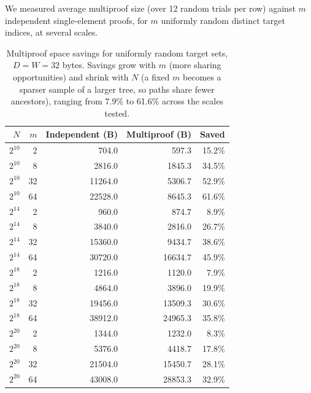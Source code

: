 We measured average multiproof size (over 12 random trials per row) against
$m$ independent single-element proofs, for $m$ uniformly random distinct
target indices, at several scales.

\begin{table}[htbp]
\centering
\begin{tabular}{@{}rrrrr@{}}
\toprule
$N$ & $m$ & Independent (B) & Multiproof (B) & Saved \\
\midrule
$2^{10}$ & 2  &   704.0 &   597.3 & 15.2\% \\
$2^{10}$ & 8  &  2816.0 &  1845.3 & 34.5\% \\
$2^{10}$ & 32 & 11264.0 &  5306.7 & 52.9\% \\
$2^{10}$ & 64 & 22528.0 &  8645.3 & 61.6\% \\
\midrule
$2^{14}$ & 2  &   960.0 &   874.7 &  8.9\% \\
$2^{14}$ & 8  &  3840.0 &  2816.0 & 26.7\% \\
$2^{14}$ & 32 & 15360.0 &  9434.7 & 38.6\% \\
$2^{14}$ & 64 & 30720.0 & 16634.7 & 45.9\% \\
\midrule
$2^{18}$ & 2  &  1216.0 &  1120.0 &  7.9\% \\
$2^{18}$ & 8  &  4864.0 &  3896.0 & 19.9\% \\
$2^{18}$ & 32 & 19456.0 & 13509.3 & 30.6\% \\
$2^{18}$ & 64 & 38912.0 & 24965.3 & 35.8\% \\
\midrule
$2^{20}$ & 2  &  1344.0 &  1232.0 &  8.3\% \\
$2^{20}$ & 8  &  5376.0 &  4418.7 & 17.8\% \\
$2^{20}$ & 32 & 21504.0 & 15450.7 & 28.1\% \\
$2^{20}$ & 64 & 43008.0 & 28853.3 & 32.9\% \\
\bottomrule
\end{tabular}
\caption{Multiproof space savings for uniformly random target sets, $D=W=32$
bytes. Savings grow with $m$ (more sharing opportunities) and shrink with
$N$ (a fixed $m$ becomes a sparser sample of a larger tree, so paths share
fewer ancestors), ranging from 7.9\% to 61.6\% across the scales tested.}
\label{tab:multiproof-savings}
\end{table}
